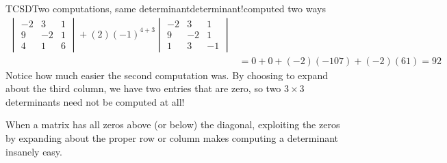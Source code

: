 \begin{example}{TCSD}{Two computations, same determinant}{determinant!computed two ways}
\begin{align*}
\begin{vmatrix}
-2 & 3 & 1\\ 
9 & -2 & 1\\ 
4 & 1 & 6
\end{vmatrix}
+
(2)(-1)^{4+3}
\begin{vmatrix}
-2 & 3 & 1\\ 
9 & -2 & 1\\ 
1 & 3 & -1
\end{vmatrix}\\
&=0+0+(-2)(-107)+(-2)(61)=92
\end{align*}
%
Notice how much easier the second computation was.  By choosing to expand about the third column, we have two entries that are zero, so two $3\times 3$ determinants need not be computed at all!  
\end{example}
%
When a matrix has all zeros above (or below) the diagonal, exploiting the zeros by expanding about the proper row or column makes computing a determinant insanely easy.
%
